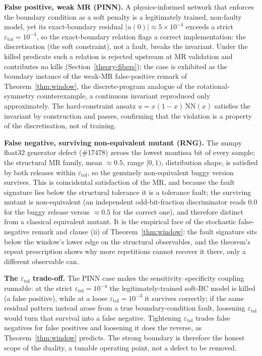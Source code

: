 \documentclass[manuscript,screen,review]{acmart}
\begin{document}
\textbf{False positive, weak MR (PINN).} A physics-informed network
that enforces the boundary condition as a soft penalty is a legitimately
trained, non-faulty model, yet its exact-boundary residual
$|u(0)| \approx 5\times10^{-4}$ exceeds a strict
$\varepsilon_{\mathrm{tol}} = 10^{-4}$, so the exact-boundary relation
flags a correct implementation: the discretisation (the soft
constraint), not a fault, breaks the invariant. Under the killed
predicate such a relation is rejected upstream at MR validation and
contributes no kills (Section~\ref{theory-fibers}); the case is
exhibited as the boundary instance of the weak-MR false-positive remark
of Theorem~\ref{thm:window}, the discrete-program analogue of the
rotational-symmetry counterexample, a continuous invariant reproduced
only approximately. The
hard-constraint ansatz $u = x(1-x)\,\mathrm{NN}(x)$ satisfies the invariant
by construction and passes, confirming that the violation is a property of
the discretisation, not of training.

\textbf{False negative, surviving non-equivalent mutant (RNG).} The
numpy float32 generator defect (\#17478) zeroes the lowest mantissa bit of
every sample; the structural MR family, mean $\approx 0.5$, range
$[0,1)$, distribution shape, is satisfied by both releases within
$\varepsilon_{\mathrm{tol}}$, so the genuinely non-equivalent buggy version
survives. This is coincidental satisfaction of the MR, and because the
fault signature lies below the structural tolerance it is a tolerance
fault; the surviving mutant is non-equivalent (an independent
odd-bit-fraction discriminator reads $0.0$ for the buggy release versus
$\approx 0.5$ for the correct one), and therefore distinct from a
classical equivalent mutant. It is the empirical face of the
stochastic false-negative remark and clause (ii) of
Theorem~\ref{thm:window}: the fault signature sits below the window's
lower edge on the structural observables, and the theorem's repeat
prescription shows why more repetitions cannot recover it there, only a
different observable can.

\textbf{The $\varepsilon_{\mathrm{tol}}$ trade-off.} The PINN case makes
the sensitivity--specificity coupling runnable: at the strict
$\varepsilon_{\mathrm{tol}} = 10^{-4}$ the legitimately-trained soft-BC
model is killed (a false positive), while at a loose
$\varepsilon_{\mathrm{tol}} = 10^{-3}$ it survives correctly; if the same
residual pattern instead arose from a true boundary-condition fault,
loosening $\varepsilon_{\mathrm{tol}}$ would turn that survival into a
false negative. Tightening
$\varepsilon_{\mathrm{tol}}$ trades false negatives for false positives and
loosening it does the reverse, as Theorem~\ref{thm:window} predicts. The strong
boundary is therefore the honest scope of the duality, a tunable
operating point, not a defect to be removed.
\end{document}
